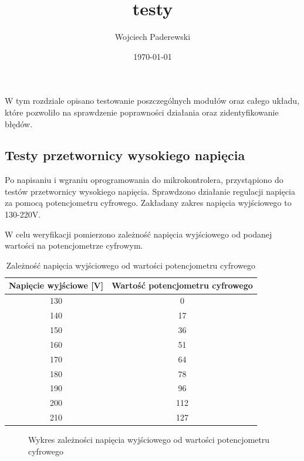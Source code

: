 \documentclass[../main.tex]{subfiles}
\author{Wojciech Paderewski}
\date{\today}
\title{testy}
\begin{document}
W tym rozdziale opisano testowanie poszczególnych 
modułów oraz całego układu, które pozwoliło na sprawdzenie poprawności działania oraz zidentyfikowanie błędów.

\subsection{Testy przetwornicy wysokiego napięcia}
Po napisaniu i wgraniu oprogramowania do mikrokontrolera, przystąpiono do testów przetwornicy wysokiego napięcia.
Sprawdzono działanie regulacji napięcia za pomocą potencjometru cyfrowego. Zakładany zakres napięcia wyjściowego to 130-220V.

W celu weryfikacji pomierzono zależność napięcia wyjściowego od podanej wartości na potencjometrze cyfrowym.

\begin{table}[H]
    \centering
    \begin{tabular}{|c|c|}
        \hline
        Napięcie wyjściowe [V] & Wartość potencjometru cyfrowego \\
        \hline
        130 & 0 \\
        140 & 17 \\
        150 & 36 \\
        160 & 51 \\
        170 & 64 \\
        180 & 78 \\
        190 & 96 \\
        200 & 112 \\
        210 & 127 \\
        \hline
    \end{tabular}
    \caption{Zależność napięcia wyjściowego od wartości potencjometru cyfrowego}
\end{table}

\begin{figure}[H]
  \centering
  \caption{Wykres zależności napięcia wyjściowego od wartości potencjometru cyfrowego}
\end{figure}
\end{document}
